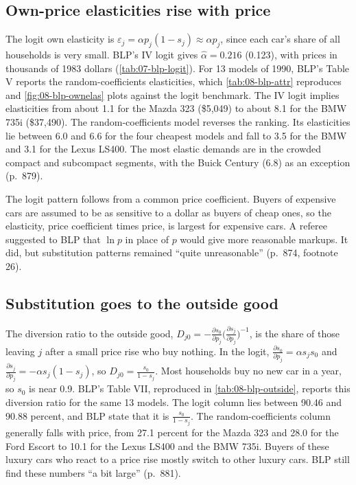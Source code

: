 \subsection{Own-price elasticities rise with price}\label{sec:07-limits-own}

The logit own elasticity is $\varepsilon_j = \alpha p_j(1 - s_j) \approx \alpha p_j$, since each car's share of
all households is very small. BLP's IV logit gives $\hat\alpha = 0.216$ (0.123), with prices in thousands of 1983
dollars (\cref{tab:07-blp-logit}). For 13 models of 1990, BLP's Table V reports the random-coefficients
elasticities, which \cref{tab:08-blp-attr} reproduces and \cref{fig:08-blp-ownelas} plots against the logit benchmark.
The IV logit implies elasticities from about 1.1 for the Mazda 323 (\$5,049) to about 8.1 for the BMW 735i
(\$37,490). The random-coefficients model reverses the ranking. Its elasticities lie between 6.0 and 6.6 for the four
cheapest models and fall to 3.5 for the BMW and 3.1 for the Lexus LS400. The most elastic demands are in the crowded
compact and subcompact segments, with the Buick Century (6.8) as an exception (p.~879).

The logit pattern follows from a common price coefficient. Buyers of expensive cars are assumed to be as sensitive
to a dollar as buyers of cheap ones, so the elasticity, price coefficient times price, is largest for expensive
cars. A referee suggested to BLP that $\ln p$ in place of $p$ would give more reasonable markups. It did, but
substitution patterns remained ``quite unreasonable'' (p.~874, footnote 26).

\subsection{Substitution goes to the outside good}\label{sec:07-limits-outside}

The diversion ratio to the outside good, $D_{j0} = -\frac{\partial s_0}{\partial p_j}\big(\frac{\partial
s_j}{\partial p_j}\big)^{-1}$, is the share of those leaving $j$ after a small price rise who buy nothing. In the
logit, $\frac{\partial s_0}{\partial p_j} = \alpha s_js_0$ and $\frac{\partial s_j}{\partial p_j} = -\alpha
s_j(1-s_j)$, so $D_{j0} = \frac{s_0}{1-s_j}$. Most households buy no new car in a year, so $s_0$ is near 0.9.
BLP's Table VII, reproduced in \cref{tab:08-blp-outside}, reports this diversion ratio for the same 13 models. The
logit column lies between 90.46 and 90.88 percent, and BLP state that it is $\frac{s_0}{1-s_j}$. The
random-coefficients column generally falls with price, from 27.1 percent for the Mazda 323 and 28.0 for the Ford Escort to 10.1
for the Lexus LS400 and the BMW 735i. Buyers of these luxury cars who react to a price rise mostly
switch to other luxury cars. BLP still find these numbers ``a bit large'' (p.~881).


